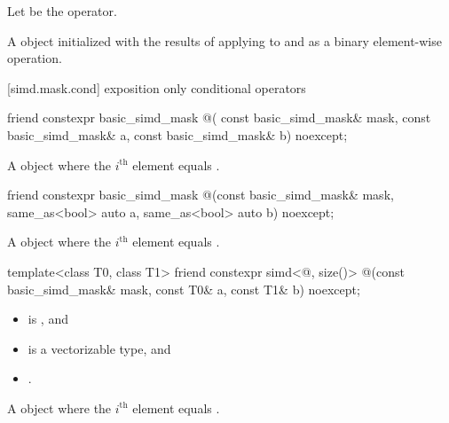 \begin{itemdescr}
  \pnum Let \op{} be the operator.

  \pnum\returns
  A  object initialized with the results of applying \op{}
  to  and  as a binary element-wise operation.
\end{itemdescr}

[simd.mask.cond]{ exposition only conditional operators}

\begin{itemdecl}
friend constexpr basic_simd_mask @\simdselect@(
  const basic_simd_mask& mask, const basic_simd_mask& a, const basic_simd_mask& b) noexcept;
\end{itemdecl}

\begin{itemdescr}
  \pnum\returns
  A  object where the $i^\text{th}$ element equals  \foralli.
\end{itemdescr}

\begin{itemdecl}
friend constexpr basic_simd_mask
@\simdselect@(const basic_simd_mask& mask, same_as<bool> auto a, same_as<bool> auto b) noexcept;
\end{itemdecl}

\begin{itemdescr}
  \pnum\returns
  A  object where the $i^\text{th}$ element equals 
  \foralli.
\end{itemdescr}

\begin{itemdecl}
template<class T0, class T1>
  friend constexpr simd<@\seebelow@, size()>
    @\simdselect@(const basic_simd_mask& mask, const T0& a, const T1& b) noexcept;
\end{itemdecl}

\begin{itemdescr}
  \pnum\constraints
  \begin{itemize}
    \item {} is , and
    \item {} is a vectorizable type, and
    \item {}.
  \end{itemize}

  \pnum\returns
  A  object where the $i^\text{th}$ element equals  \foralli.
\end{itemdescr}

